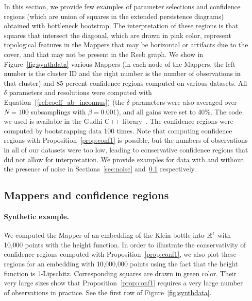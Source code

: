 In this section, we provide few examples of parameter selections and confidence regions (which are union of squares in the extended persistence diagrams) 
obtained with bottleneck bootstrap. The interpretation of these regions is that squares that intersect the diagonal, 
which are drawn in pink color, represent topological features in the Mappers that may be horizontal or artifacts due to the cover,
and that may not be present in the Reeb graph. 
We show in Figure~\ref{fig:synthdata} various Mappers (in each node of the Mappers, the left number is the cluster ID and the right number is the 
number of observations in that cluster) 
and 85 percent confidence regions computed on various datasets.
All $\delta$ parameters and resolutions were computed with Equation~(\ref{ref:coeff_ab_inconnus}) 
(the $\delta$ parameters were also averaged over $N=100$ subsamplings with $\beta=0.001$), 
and all gains were set to $40\%$. The code we used is available in the Gudhi C++ library~\cite{gudhi:CoverComplex}. 
The confidence regions were computed by bootstrapping data 100 times. 
Note that computing confidence regions with Proposition~\ref{prop:conf1} is possible, but the numbers of observations in all of our datasets
were too low, leading to conservative confidence regions that did not allow for interpretation.   
We provide examples for data with and without the presence of noise in Sections~\ref{sec:noise} and~\ref{sec:nonoise} respectively.

\subsection{Mappers and confidence regions}\label{sec:nonoise}

\paragraph{Synthetic example.} We computed the Mapper of
an embedding of the Klein bottle into $\mathbb{R}^4$ with 10,000 points with the height function.
In order to illustrate the conservativity of confidence regions computed with Proposition~\ref{prop:conf1},
we also plot these regions for an embedding with 10,000,000 points using the fact that the height function is 1-Lipschitz. 
Corresponding squares are drawn in green color.
Their very large sizes show that Proposition~\ref{prop:conf1} requires a very large number of observations in practice.
See the first row of Figure~\ref{fig:synthdata}.

